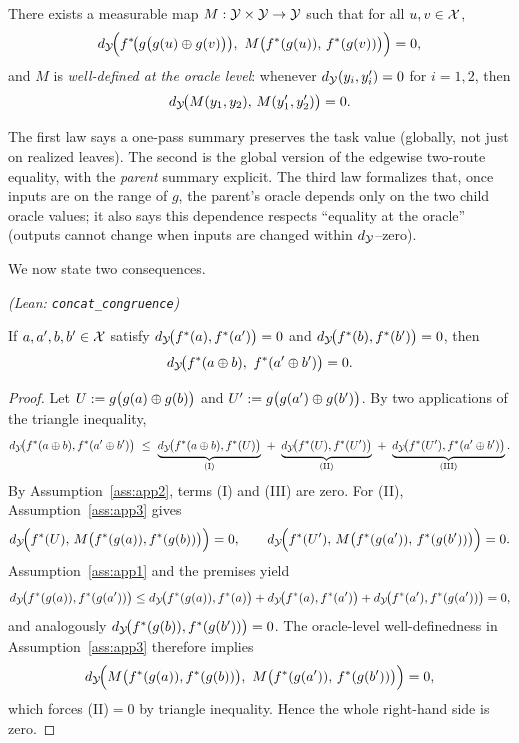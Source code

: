 \begin{assumption}\label{ass:app3}
There exists a measurable map $M:\mathcal{Y}\times\mathcal{Y}\to\mathcal{Y}$ such that for all $u,v\in\mathcal{X}$,
\[
d_{\mathcal{Y}}\!\Big(f^{\ast}\!\big(g\big(g(u)\oplus g(v)\big)\big),\ M\big(f^{\ast}(g(u)),\,f^{\ast}(g(v))\big)\Big)=0,
\]
and $M$ is \emph{well-defined at the oracle level}: whenever $d_{\mathcal{Y}}(y_i,y_i')=0$ for $i=1,2$, then
\[
d_{\mathcal{Y}}\!\big(M(y_1,y_2),\,M(y_1',y_2')\big)=0.
\]
\end{assumption}

The first law says a one-pass summary preserves the task value (globally, not just on realized leaves). The second is the global version of the edgewise two-route equality, with the \emph{parent} summary explicit. The third law formalizes that, once inputs are on the range of $g$, the parent’s oracle depends only on the two child oracle values; it also says this dependence respects ``equality at the oracle'' (outputs cannot change when inputs are changed within $d_{\mathcal{Y}}$–zero).

\medskip

We now state two consequences. 


\begin{proposition}\label{prop:congruence-strings}
\emph{(Lean: \texttt{concat\_congruence})}

If $a,a',b,b'\in\mathcal{X}$ satisfy $d_{\mathcal{Y}}\!\big(f^{\ast}(a),f^{\ast}(a')\big)=0$ and $d_{\mathcal{Y}}\!\big(f^{\ast}(b),f^{\ast}(b')\big)=0$, then
\[
\metric\!\big(\fstar(a\concat b),\ \fstar(a'\concat b')\big)=0.
\]
\end{proposition}

\begin{proof}
Let $U:=g\big(g(a)\oplus g(b)\big)$ and $U':=g\big(g(a')\oplus g(b')\big)$. By two applications of the triangle inequality,
\[
\metric\!\big(\fstar(a\concat b),\fstar(a'\concat b')\big)\ \le\ 
\underbrace{\metric\!\big(\fstar(a\concat b),\fstar(U)\big)}_{\text{(I)}}\ +\
\underbrace{\metric\!\big(\fstar(U),\fstar(U')\big)}_{\text{(II)}}\ +\
\underbrace{\metric\!\big(\fstar(U'),\fstar(a'\concat b')\big)}_{\text{(III)}}.
\]
By Assumption~\ref{ass:app2}, terms (I) and (III) are zero. For (II), Assumption~\ref{ass:app3} gives
\[
d_{\mathcal{Y}}\!\Big(f^{\ast}(U),\,M\big(f^{\ast}(g(a)),f^{\ast}(g(b))\big)\Big)=0,\qquad
d_{\mathcal{Y}}\!\Big(f^{\ast}(U'),\,M\big(f^{\ast}(g(a')),\,f^{\ast}(g(b'))\big)\Big)=0.
\]
Assumption~\ref{ass:app1} and the premises yield
\[
d_{\mathcal{Y}}\!\big(f^{\ast}(g(a)),f^{\ast}(g(a'))\big)\le d_{\mathcal{Y}}\!\big(f^{\ast}(g(a)),f^{\ast}(a)\big)+d_{\mathcal{Y}}\!\big(f^{\ast}(a),f^{\ast}(a')\big)+d_{\mathcal{Y}}\!\big(f^{\ast}(a'),f^{\ast}(g(a'))\big)=0,
\]
and analogously $d_{\mathcal{Y}}\!\big(f^{\ast}(g(b)),f^{\ast}(g(b'))\big)=0$. The oracle-level well-definedness in Assumption~\ref{ass:app3} therefore implies
\[
\metric\!\Big(M\big(\fstar(g(a)),\fstar(g(b))\big),\ M\big(\fstar(g(a')),\,\fstar(g(b'))\big)\Big)=0,
\]
which forces (II)$=0$ by triangle inequality. Hence the whole right-hand side is zero.
\end{proof}

